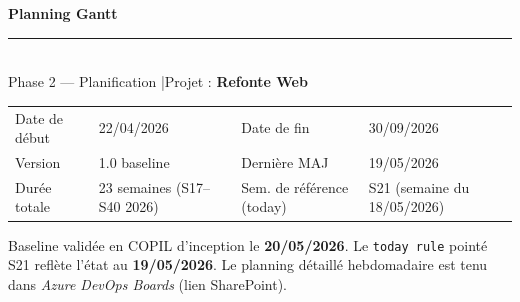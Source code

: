 \documentclass[11pt,a4paper,oneside]{report}
\begin{document}
\small

\begin{center}
{\LARGE\bfseries\color{cnNavy} Planning Gantt}\\[4pt]
\textcolor{cnOrange}{\rule{10cm}{1pt}}\\[4pt]
{\large\color{cnSlate} Phase 2 --- Planification \quad|\quad Projet : \textbf{Refonte Web}}
\end{center}

\vspace{4pt}
\renewcommand{\arraystretch}{1.4}
\begin{tabularx}{\textwidth}{L{3.5cm} Y L{3.5cm} Y}
\toprule
{} &  &  &  \\
\midrule
Date de début   & 22/04/2026             & Date de fin    & 30/09/2026 \\
Version         & 1.0 baseline           & Dernière MAJ   & 19/05/2026 \\
Durée totale    & 23 semaines (S17--S40 2026) & Sem. de référence (today) & S21 (semaine du 18/05/2026) \\
\bottomrule
\end{tabularx}

\vspace{4pt}
\begin{finding}
Baseline validée en COPIL d'inception le \textbf{20/05/2026}. Le \texttt{today rule} pointé S21 reflète l'état au \textbf{19/05/2026}. Le planning détaillé hebdomadaire est tenu dans \textit{Azure DevOps Boards} (lien SharePoint).
\end{finding}

\vspace{8pt}
\end{document}
